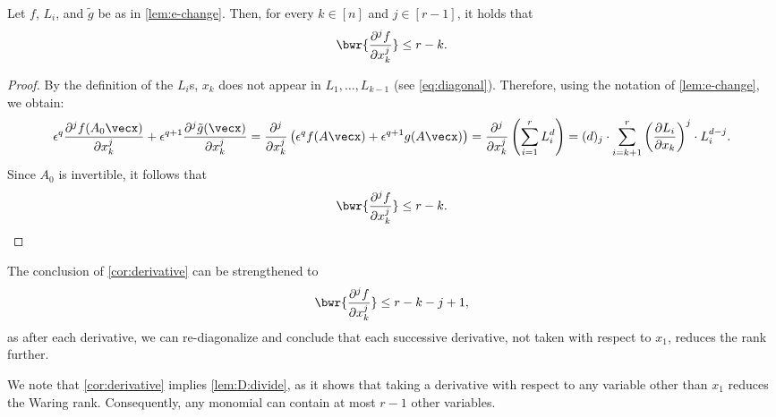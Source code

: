 \documentclass{article}
\begin{document}
\begin{corollary}\label{cor:derivative}
    Let $f$, $L_i$, and $\tilde{g}$ be as in \autoref{lem:e-change}. Then, for every $k\in [n]$ and $j\in [r-1]$, it holds that 
    \[
    \bwr{\frac{\partial^j f}{\partial x_k^j}} \leq r-k.
    \]
\end{corollary}
\begin{proof}
    By the definition of the $L_i$s, $x_k$ does not appear in $L_1, \ldots, L_{k-1}$ (see \eqref{eq:diagonal}). Therefore, using the notation of \autoref{lem:e-change}, we obtain:
    \begin{equation*}
        \epsilon^q \frac{\partial^j f(A_0\vecx)}{\partial x_k^j} + \epsilon^{q+1} \frac{\partial^j \tilde{g}(\vecx)}{\partial x_k^j} =
        \frac{\partial^j}{\partial x_k^j} \left( \epsilon^q f(A\vecx) + \epsilon^{q+1}g(A\vecx)\right)
        = \frac{\partial^j}{\partial x_k^j} \left( \sum_{i=1}^{r} L_i^d \right) 
        = (d)_j \cdot \sum_{i=k+1}^{r} \left( \frac{\partial L_i}{\partial x_k} \right)^j \cdot L_i^{d-j}.
    \end{equation*}
    Since $A_0$ is invertible, it follows that 
    \[
    \bwr{\frac{\partial^j f}{\partial x_k^j}} \leq r-k.
    \]
\end{proof}

\begin{remark}\label{rem:strengthened}
    The conclusion of \autoref{cor:derivative} can be strengthened to 
    \[
    \bwr{\frac{\partial^j f}{\partial x_k^j}} \leq r-k-j+1,
    \]
    as after each derivative, we can re-diagonalize and conclude that each successive derivative, not taken with respect to $x_1$, reduces the rank further.
\end{remark}

\begin{remark}\label{rem:imply-D}
    We note that \autoref{cor:derivative} implies \autoref{lem:D:divide}, as it shows that taking a derivative with respect to any variable other than $x_1$ reduces the Waring rank. Consequently, any monomial can contain at most $r-1$ other variables.
\end{remark}
\end{document}
